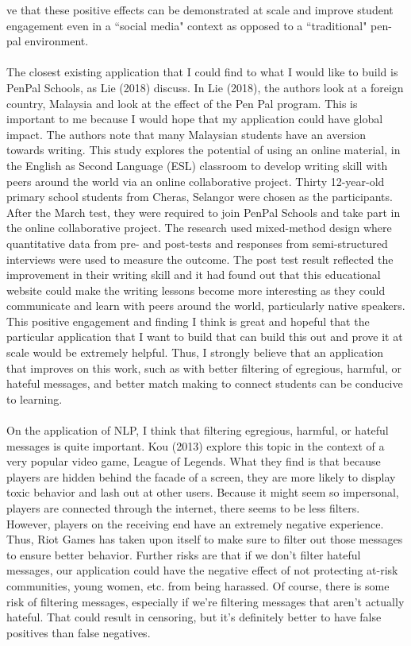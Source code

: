 \documentclass[12pt, final]{article}
\begin{document}
ve that these positive effects can be demonstrated at scale and improve student engagement even in a ``social media" context as opposed to a ``traditional" pen-pal environment. 
\\
\\
The closest existing application that I could find to what I would like to build is PenPal Schools, as Lie (2018) discuss. In Lie (2018), the authors look at a foreign country, Malaysia and look at the effect of the Pen Pal program. This is important to me because I would hope that my application could have global impact. The authors note that many Malaysian students have an aversion towards writing. This study explores the potential of using an online material, in the English as Second Language (ESL) classroom to develop writing skill with peers around the world via an online collaborative project. Thirty 12-year-old primary school students from Cheras, Selangor were chosen as the participants. After the March test, they were required to join PenPal Schools and take part in the online collaborative project.  The research used mixed-method design where quantitative data from pre- and post-tests and responses from semi-structured interviews were used to measure the outcome. The post test result reflected the improvement in their writing skill and it had found out that this educational website could make the writing lessons become more interesting as they could communicate and learn with peers around the world, particularly native speakers. This positive engagement and finding I think is great and hopeful that the particular application that I want to build that can build this out and prove it at scale would be extremely helpful. Thus, I strongly believe that an application that improves on this work, such as with better filtering of egregious, harmful, or hateful messages, and better match making to connect students can be conducive to learning.
\\
\\
On the application of NLP, I think that filtering egregious, harmful, or hateful messages is quite important. Kou (2013) explore this topic in the context of a very popular video game, League of Legends. What they find is that because players are hidden behind the facade of a screen, they are more likely to display toxic behavior and lash out at other users. Because it might seem so impersonal, players are connected through the internet, there seems to be less filters. However, players on the receiving end have an extremely negative experience. Thus, Riot Games has taken upon itself to make sure to filter out those messages to ensure better behavior. Further risks are that if we don't filter hateful messages, our application could have the negative effect of not protecting at-risk communities, young women, etc. from being harassed. Of course, there is some risk of filtering messages, especially if we're filtering messages that aren't actually hateful. That could result in censoring, but it's definitely better to have false positives than false negatives. 
\end{document}
